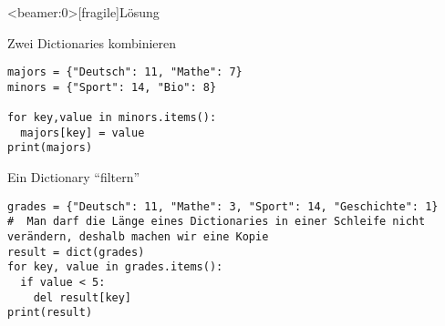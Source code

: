 \begin{frame}<beamer:0>[fragile]{Lösung}

\begin{solutionblock}{Zwei Dictionaries kombinieren}
\begin{verbatim}
majors = {"Deutsch": 11, "Mathe": 7}
minors = {"Sport": 14, "Bio": 8}

for key,value in minors.items():
  majors[key] = value
print(majors)
\end{verbatim}
\end{solutionblock}

\vspace{12pt}

\begin{solutionblock}{Ein Dictionary \enquote{filtern}}
\begin{verbatim}
grades = {"Deutsch": 11, "Mathe": 3, "Sport": 14, "Geschichte": 1}
#  Man darf die Länge eines Dictionaries in einer Schleife nicht verändern, deshalb machen wir eine Kopie
result = dict(grades)
for key, value in grades.items():
  if value < 5:
    del result[key]
print(result)
\end{verbatim}
\end{solutionblock}

\end{frame}


